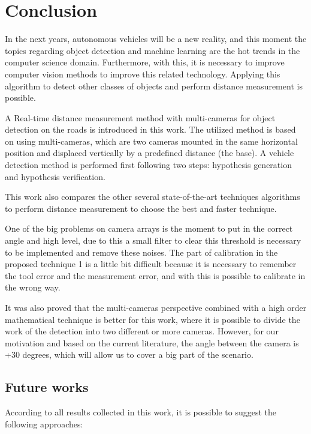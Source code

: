 \chapter{Conclusion}
\label{capitulo6}


In the next years, autonomous vehicles will be a new reality, and this moment the topics regarding object detection and machine learning are the hot trends in the computer science domain. Furthermore, with this, it is necessary to improve computer vision methods to improve this related technology. Applying this algorithm to detect other classes of objects and perform distance measurement is possible. 

A Real-time distance measurement method with multi-cameras for object detection on the roads is introduced in this work. The utilized method is based on using multi-cameras, which are two cameras mounted in the same horizontal position and displaced vertically by a predefined distance (the base). A vehicle detection method is performed first following two steps: hypothesis generation and hypothesis verification. 


This work also compares the other several state-of-the-art techniques algorithms to perform distance measurement to choose the best and faster technique. 

One of the big problems on camera arrays is the moment to put in the correct angle and high level, due to this a small filter to clear this threshold is necessary to be implemented and remove these noises. The part of calibration in the proposed technique 1 is a little bit difficult because it is necessary to remember the tool error and the measurement error, and with this is possible to calibrate in the wrong way. 

It was also proved that the multi-cameras perspective combined with a high order mathematical technique is better for this work, where it is possible to divide the work of the detection into two different or more cameras. However, for our motivation and based on the current literature, the angle between the camera is +30 degrees, which will allow us to cover a big part of the scenario.   

\section{Future works}

According to all results collected in this work, it is possible to suggest the following approaches:

